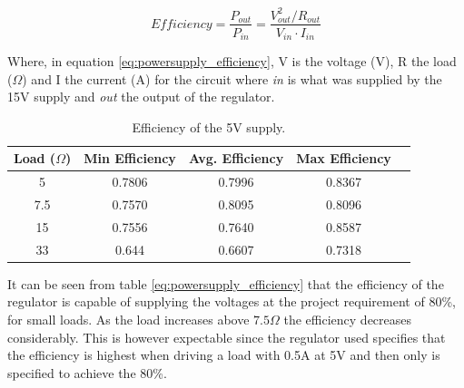 \begin{equation}
Efficiency = \frac{P_{out}}{P_{in}} = \frac{V_{out}^2 / R_{out}}{V_{in} \cdot I_{in}}
\label{eq:powersupply_efficiency}
\end{equation}

Where, in equation \ref{eq:powersupply_efficiency}, V is the voltage (V), R the load ($\Omega$) and I the current (A) for the circuit where \textit{in} is what was supplied by the 15V supply and \textit{out} the output of the regulator.


\begin{table}[H]
\centering
\begin{tabular}{|c|c|c|c|c|}
\hline
Load ($\Omega$) & Min Efficiency & Avg. Efficiency & Max Efficiency \\ \hline
5 & 0.7806 & 0.7996 & 0.8367 \\ \hline
7.5 & 0.7570 & 0.8095 & 0.8096 \\ \hline
15 & 0.7556 & 0.7640 & 0.8587 \\ \hline
33 & 0.644 & 0.6607 & 0.7318 \\ \hline
\end{tabular}
\caption{Efficiency of the 5V supply.}
\label{tab:voltageefficiency}
\end{table}

It can be seen from table \ref{eq:powersupply_efficiency} that the efficiency of the regulator is capable of supplying the voltages at the project requirement of 80\%, for small loads.
As the load increases above $7.5\Omega$ the efficiency decreases considerably.
This is however expectable since the regulator used specifies that the efficiency is highest when driving a load with 0.5A at 5V and then only is specified to achieve the 80\%.
